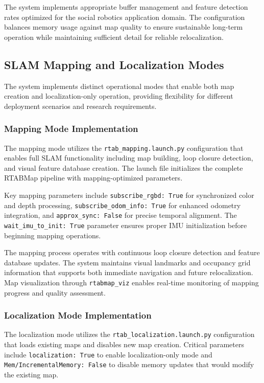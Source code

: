The system implements appropriate buffer management and feature detection rates optimized for the social robotics application domain. The configuration balances memory usage against map quality to ensure sustainable long-term operation while maintaining sufficient detail for reliable relocalization.

\subsection{SLAM Mapping and Localization Modes}

The system implements distinct operational modes that enable both map creation and localization-only operation, providing flexibility for different deployment scenarios and research requirements.

\subsubsection{Mapping Mode Implementation}

The mapping mode utilizes the \texttt{rtab\_mapping.launch.py} configuration that enables full SLAM functionality including map building, loop closure detection, and visual feature database creation. The launch file initializes the complete RTABMap pipeline with mapping-optimized parameters.

Key mapping parameters include \texttt{subscribe\_rgbd: True} for synchronized color and depth processing, \texttt{subscribe\_odom\_info: True} for enhanced odometry integration, and \texttt{approx\_sync: False} for precise temporal alignment. The \texttt{wait\_imu\_to\_init: True} parameter ensures proper IMU initialization before beginning mapping operations.

The mapping process operates with continuous loop closure detection and feature database updates. The system maintains visual landmarks and occupancy grid information that supports both immediate navigation and future relocalization. Map visualization through \texttt{rtabmap\_viz} enables real-time monitoring of mapping progress and quality assessment.

\subsubsection{Localization Mode Implementation}

The localization mode utilizes the \texttt{rtab\_localization.launch.py} configuration that loads existing maps and disables new map creation. Critical parameters include \texttt{localization: True} to enable localization-only mode and \texttt{Mem/IncrementalMemory: False} to disable memory updates that would modify the existing map.


